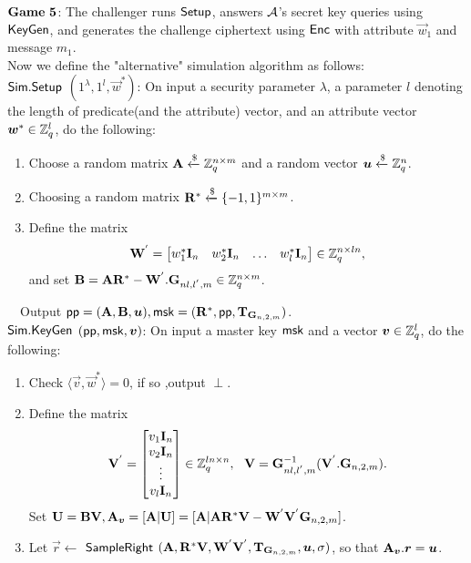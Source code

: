 $\mathbf{Game\ 5}$: The challenger runs $\mathsf{Setup}$, answers $\mathcal{A}$'s secret key queries using $\mathsf{KeyGen}$, and generates the challenge ciphertext using $\mathsf{Enc}$ with attribute $\vec{w}_{1}$ and message $m_{1}$.\\[0.2cm]
Now we define the "alternative" simulation algorithm as follows:\\[0.4cm]
$\mathsf{Sim}.\mathsf{Setup}$ $(1^{\lambda},1^{l},\vec{w}^{*})$: On input a security parameter $\lambda$, a parameter $l$ denoting the length of predicate(and the attribute) vector, and an attribute vector $\boldsymbol{w}^{*} \in \mathbb{Z}^{l}_{q}$, do the following:
\begin{enumerate}
\item Choose a random matrix $\mathbf{A} \xleftarrow {\$} \mathbb{Z}^{n \times m}_{q}$ and a random vector $\boldsymbol{u} \xleftarrow {\$} \mathbb{Z}^{n}_{q}$.\

\item Choosing a random matrix $\mathbf{R}^{*} \xleftarrow {\$} \{-1,1\}^{m \times m}$.\

\item Define the matrix
\begin{equation}
\mathbf{W}^{'}= \begin{bmatrix}
w^{*}_{1} \mathbf{I}_{n}&w^{*}_{2} \mathbf{I}_{n}&\ldots&w^{*}_{l} \mathbf{I}_{n}
\end{bmatrix} \in \mathbb{Z}^{n \times ln}_{q},
\end{equation}
and set $\mathbf{B}=\mathbf{A}\mathbf{R}^{*}-\mathbf{W}^{'}.\mathbf{G}_{nl,l^{'},m} \in \mathbb{Z}^{n \times m}_{q}$.
\end{enumerate}
~~Output $\mathsf{pp}=(\mathbf{A}, \mathbf{B}, \boldsymbol{u}),\mathsf{msk}=(\mathbf{R}^{*}, \mathsf{pp}, \mathbf{T}_{\mathbf{G}_{n,2,m}})$.\\[0.4cm]
$\mathsf{Sim}.\mathsf{KeyGen}$ $(\mathsf{pp}, \mathsf{msk}, \boldsymbol{v})$: On input a master key $\mathsf{msk}$ and a vector $\boldsymbol{v} \in \mathbb{Z}^{l}_{q}$, do the following:
\begin{enumerate}
\item Check $\langle \vec{v}, \vec{w}^{*} \rangle =0$, if so ,output $\perp$.\

\item Define the matrix
\begin{equation}
\mathbf{V}^{'}= \begin{bmatrix}
v_{1} \mathbf{I}_{n}\\
v_{2} \mathbf{I}_{n}\\
\vdots\\
v_{l} \mathbf{I}_{n}
\end{bmatrix} \in \mathbb{Z}^{ln \times n}_{q},~~ \mathbf{V}=\mathbf{G}^{-1}_{nl,l^{'},m}(\mathbf{V}^{'}.\mathbf{G}_{n,2,m}).
\end{equation}
Set $\mathbf{U}=\mathbf{BV}, \mathbf{A}_{\boldsymbol{v}}=[\mathbf{A}|\mathbf{U}]=[\mathbf{A}|\mathbf{A}\mathbf{R}^{*}\mathbf{V}-\mathbf{W}^{'}\mathbf{V}^{'}\mathbf{G}_{n,2,m}]$.\

\item Let $\vec{r}\leftarrow$ $\mathsf{SampleRight}$ $(\mathbf{A},\mathbf{R}^{*}\mathbf{V}, \mathbf{W}^{'}\mathbf{V}^{'}, \mathbf{T}_{\mathbf{G}_{n,2,m}}, \boldsymbol{u}, \sigma)$, so that $\mathbf{A}_{\boldsymbol{v}}.\boldsymbol{r}=\boldsymbol{u}$.
\end{enumerate}
